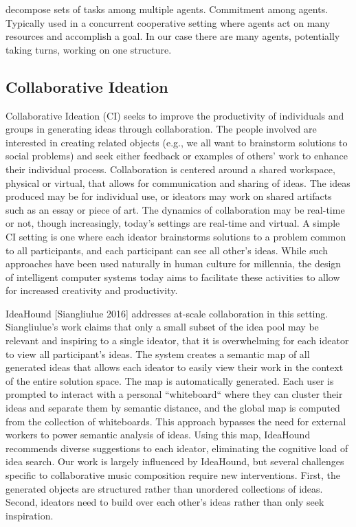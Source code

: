 \documentclass[final,authoryear,5p,times,twocolumn]{elsarticle}
\begin{document}

decompose sets of tasks among multiple agents. Commitment among agents. Typically used in a concurrent cooperative setting where agents act on many resources and accomplish a goal. In our case there are many agents, potentially taking turns, working on one structure. 

\subsection{Collaborative Ideation}
Collaborative Ideation (CI) seeks to improve the productivity of individuals and groups in generating ideas through collaboration. The people involved are interested in creating related objects (e.g., we all want to brainstorm solutions to social problems) and seek either feedback or examples of others' work to enhance their individual process. Collaboration is centered around a shared workspace, physical or virtual, that allows for communication and sharing of ideas. The ideas produced may be for individual use, or ideators may work on shared artifacts such as an essay or piece of art. The dynamics of collaboration may be real-time or not, though increasingly, today's settings are real-time and virtual. A simple CI setting is one where each ideator brainstorms solutions to a problem common to all participants, and each participant can see all other's ideas. While such approaches have been used naturally in human culture for millennia, the design of intelligent computer systems today aims to facilitate these activities to allow for increased creativity and productivity. 

IdeaHound [Siangliulue 2016] addresses at-scale collaboration in this setting. Siangliulue's work claims that only a small subset of the idea pool may be relevant and inspiring to a single ideator, that it is overwhelming for each ideator to view all participant's ideas. The system creates a semantic map of all generated ideas that allows each ideator to easily view their work in the context of the entire solution space. The map is automatically generated. Each user is prompted to interact with a personal ``whiteboard`` where they can cluster their ideas and separate them by semantic distance, and the global map is computed from the collection of whiteboards. This approach bypasses the need for external workers to power semantic analysis of ideas.  Using this map, IdeaHound recommends diverse suggestions to each ideator, eliminating the cognitive load of idea search. Our work is largely influenced by IdeaHound, but several challenges specific to collaborative music composition require new interventions. First, the generated objects are structured rather than unordered collections of ideas. Second, ideators need to build over each other's ideas rather than only seek inspiration.
\end{document}
